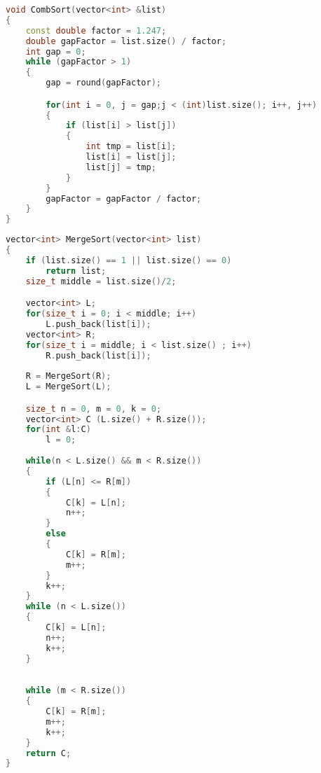         \begin{lstlisting}[language=C++, label=lst:sort:Comb, caption=Алгоритм сортировки расчёской]
void CombSort(vector<int> &list)
{
    const double factor = 1.247;
    double gapFactor = list.size() / factor;
    int gap = 0;
    while (gapFactor > 1)
    {
        gap = round(gapFactor);

        for(int i = 0, j = gap;j < (int)list.size(); i++, j++)
        {
            if (list[i] > list[j])
            {
                int tmp = list[i];
                list[i] = list[j];
                list[j] = tmp;
            }
        }
        gapFactor = gapFactor / factor;
    }
}
        \end{lstlisting}
        \par \text{      }
        \par \text{      }
        \par \text{      }
        \begin{lstlisting}[language=C++, label=lst:sort:Merge, caption=Алгоритм сортировки слиянием]
vector<int> MergeSort(vector<int> list)
{
    if (list.size() == 1 || list.size() == 0)
        return list;
    size_t middle = list.size()/2;

    vector<int> L;
    for(size_t i = 0; i < middle; i++)
        L.push_back(list[i]);
    vector<int> R;
    for(size_t i = middle; i < list.size() ; i++)
        R.push_back(list[i]);
    
    R = MergeSort(R);
    L = MergeSort(L);

    size_t n = 0, m = 0, k = 0;
    vector<int> C (L.size() + R.size());
    for(int &l:C)
        l = 0;
    
    while(n < L.size() && m < R.size())
    {
        if (L[n] <= R[m])
        {
            C[k] = L[n];
            n++;
        }
        else
        {
            C[k] = R[m];
            m++;
        }
        k++;
    }
    while (n < L.size())
    {
        C[k] = L[n];
        n++;
        k++;
    }
    \end{lstlisting}
        \par \text{      }
        \par \text{      }
        \par \text{      }
        \begin{lstlisting}[language=C++, label=lst:sort:Merge, caption=Алгоритм сортировки слиянием]

    while (m < R.size())
    {
        C[k] = R[m];
        m++;
        k++;
    }
    return C;
}
        \end{lstlisting}
        
